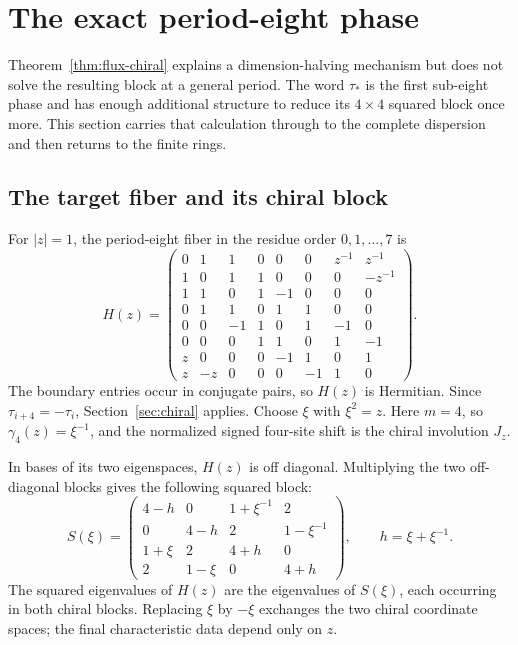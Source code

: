 \section{The exact period-eight phase}
\label{sec:period8}

Theorem~\ref{thm:flux-chiral} explains a dimension-halving mechanism but does
not solve the resulting block at a general period.  The word $\tau_*$ is the
first sub-eight phase and has enough additional structure to reduce its
$4\times4$ squared block once more.  This section carries that calculation
through to the complete dispersion and then returns to the finite rings.

\subsection{The target fiber and its chiral block}

For $|z|=1$, the period-eight fiber in the residue order $0,1,\ldots,7$ is
\begin{equation}
 H(z)=\begin{pmatrix}
0&1&1&0&0&0&z^{-1}&z^{-1}\\
1&0&1&1&0&0&0&-z^{-1}\\
1&1&0&1&-1&0&0&0\\
0&1&1&0&1&1&0&0\\
0&0&-1&1&0&1&-1&0\\
0&0&0&1&1&0&1&-1\\
z&0&0&0&-1&1&0&1\\
z&-z&0&0&0&-1&1&0
\end{pmatrix}.
\label{eq:period8-fiber}
\end{equation}
The boundary entries occur in conjugate pairs, so $H(z)$ is Hermitian.  Since
$\tau_{i+4}=-\tau_i$, Section~\ref{sec:chiral} applies.  Choose $\xi$ with
$\xi^2=z$.  Here $m=4$, so $\gamma_4(z)=\xi^{-1}$, and the normalized signed
four-site shift is the chiral involution $J_z$.

In bases of its two eigenspaces, $H(z)$ is off diagonal.  Multiplying the two
off-diagonal blocks gives the following squared block:
\begin{equation}
 S(\xi)=
 \begin{pmatrix}
4-h&0&1+\xi^{-1}&2\\
0&4-h&2&1-\xi^{-1}\\
1+\xi&2&4+h&0\\
2&1-\xi&0&4+h
 \end{pmatrix},
 \qquad h=\xi+\xi^{-1}.
 \label{eq:period8-squared-block}
\end{equation}
The squared eigenvalues of $H(z)$ are the eigenvalues of $S(\xi)$, each
occurring in both chiral blocks.  Replacing $\xi$ by $-\xi$ exchanges the two
chiral coordinate spaces; the final characteristic data depend only on $z$.


